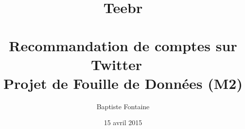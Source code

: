 
\title{Teebr\\
    ~\\
  \large Recommandation de comptes sur Twitter
    ~\\
  \large Projet de Fouille de Données (M2)}

\author{Baptiste Fontaine}
\date{15 avril 2015}
